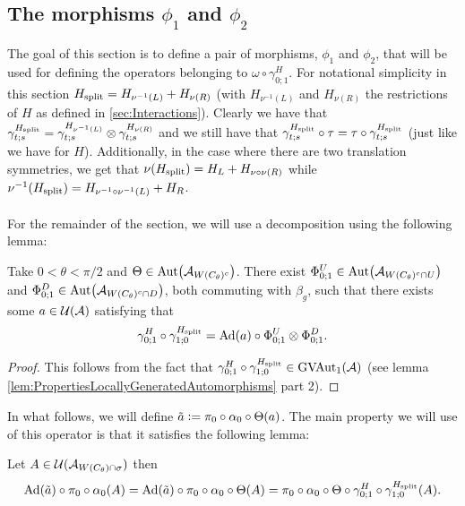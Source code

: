 \documentclass[11pt,a4paper,twoside]{article}
\numberwithin{equation}{section}
\begin{document}
	\subsection{The morphisms $\phi_1$ and $\phi_2$}
	The goal of this section is to define a pair of morphisms, $\phi_1$ and $\phi_2$, that will be used for defining the operators belonging to $\omega\circ\gamma^H_{0;1}$. For notational simplicity in this section ${H_{\text{split}}}=H_{\nu^{-1}(L)}+H_{\nu(R)}$ (with $H_{\nu^{-1}(L)}$ and $H_{\nu(R)}$ the restrictions of $H$ as defined in \ref{sec:Interactions}). Clearly we have that $\gamma^{{H_{\text{split}}}}_{t;s}=\gamma^{H_{\nu^{-1}(L)}}_{t;s}\otimes\gamma^{H_{\nu(R)}}_{t;s}$ and we still have that $\gamma^{{H_{\text{split}}}}_{t;s}\circ\tau=\tau\circ\gamma^{{H_{\text{split}}}}_{t;s}$ (just like we have for $H$). Additionally, in the case where there are two translation symmetries, we get that $\nu({H_{\text{split}}})=H_L+H_{\nu\circ\nu(R)}$ while $\nu^{-1}({H_{\text{split}}})=H_{\nu^{-1}\circ\nu^{-1}(L)}+H_{R}$.\\\\
	For the remainder of the section, we will use a decomposition using the following lemma:
	\begin{lemma}\label{lem:DefinitionOfGroupMorphismVAutEquation}
		Take $0<\theta<\pi/2$ and $\Theta\in \Aut{\AA_{W(C_\theta)^c}}$. There exist $\Phi^U_{0;1}\in\Aut{\AA_{W(C_\theta)^c\cap U}}$ and $\Phi^D_{0;1}\in\Aut{\AA_{W(C_\theta)^c\cap D}}$, both commuting with $\beta_g$, such that there exists some $a\in\mathcal U(\mathcal A)$ satisfying that
		\begin{equation}\label{eq:DefinitionOfGroupMorphismVAutEquation}
			\gamma^H_{0;1}\circ\gamma^{\Hsplit}_{1;0}=\Ad{a}\circ \Phi^U_{0;1}\otimes\Phi^D_{0;1}.
		\end{equation}
	\end{lemma}
	\begin{proof}
		This follows from the fact that $\gamma^H_{0;1}\circ\gamma^{{H_{\text{split}}}}_{1;0}\in \textrm{GVAut}_1(\mathcal A)$ (see lemma \ref{lem:PropertiesLocallyGeneratedAutomorphisms} part 2).
	\end{proof}
	In what follows, we will define $\tilde{a}\vcentcolon= \pi_0\circ\alpha_0\circ\Theta(a)$. The main property we will use of this operator is that it satisfies the following lemma:
	\begin{lemma}\label{lem:PropertyTilde_a}
		Let $A\in\mathcal U(\mathcal A_{W(C_\theta)\cap\sigma})$ then
		\begin{equation}
			\Ad{\tilde{a}}\circ\pi_0\circ\alpha_0(A)=\Ad{\tilde{a}}\circ\pi_0\circ\alpha_0\circ\Theta(A)=\pi_0\circ\alpha_0\circ\Theta\circ\gamma^H_{0;1}\circ\gamma^{\Hsplit}_{1;0}(A).
		\end{equation}
	\end{lemma}
\end{document}
